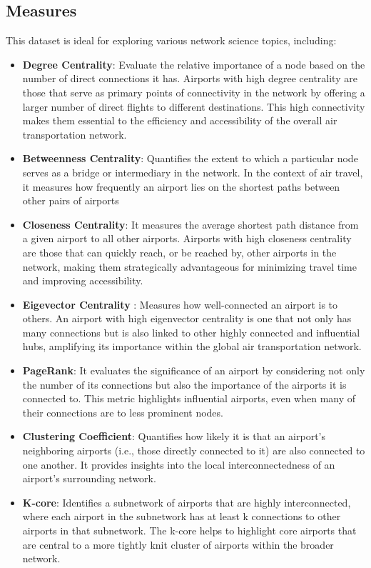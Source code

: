 \documentclass[12pt]{article}
\begin{document}
\subsection{Measures}
This dataset is ideal for exploring various network science topics, including:
\begin{itemize}
    \item \textbf{Degree Centrality}: Evaluate the relative importance of a node based on the number of direct connections it has. Airports with high degree centrality are those that serve as primary points of connectivity in the network by offering a larger number of direct flights to different destinations. This high connectivity makes them essential to the efficiency and accessibility of the overall air transportation network.
    \item \textbf{Betweenness Centrality}: Quantifies the extent to which a particular node serves as a bridge or intermediary in the network. In the context of air travel, it measures how frequently an airport lies on the shortest paths between other pairs of airports
    \item \textbf{Closeness Centrality}: It measures the average shortest path distance from a given airport to all other airports. Airports with high closeness centrality are those that can quickly reach, or be reached by, other airports in the network, making them strategically advantageous for minimizing travel time and improving accessibility.
    \item \textbf{Eigevector Centrality }: Measures how well-connected an airport is to others. An airport with high eigenvector centrality is one that not only has many connections but is also linked to other highly connected and influential hubs, amplifying its importance within the global air transportation network.
    \item \textbf{PageRank}: It evaluates the significance of an airport by considering not only the number of its connections but also the importance of the airports it is connected to. This metric highlights influential airports, even when many of their connections are to less prominent nodes.
    \item \textbf{Clustering Coefficient}: Quantifies how likely it is that an airport’s neighboring airports (i.e., those directly connected to it) are also connected to one another. It provides insights into the local interconnectedness of an airport's surrounding network.
    \item \textbf{K-core}: Identifies a subnetwork of airports that are highly interconnected, where each airport in the subnetwork has at least k connections to other airports in that subnetwork. The k-core helps to highlight core airports that are central to a more tightly knit cluster of airports within the broader network.
    \end{itemize}
    
\end{document}
